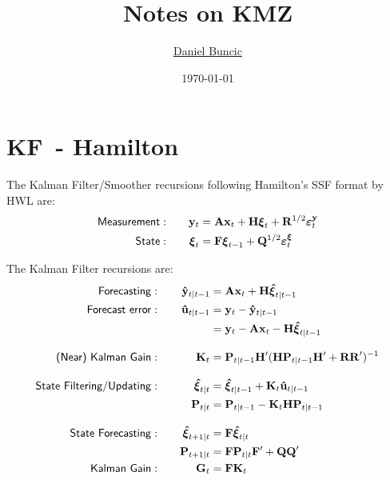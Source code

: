 \documentclass[a4paper,12pt]{article}
\begin{document}
\title{\vspace*{-20mm}Notes on KMZ}
\author{\href{http://www.danielbuncic.com}{Daniel Buncic}}
\date{\vspace*{-4mm}\textsf{\small \today}}
\maketitle

\section{KF\ - Hamilton}

The Kalman Filter/Smoother recursions following Hamilton's SSF format by HWL
are: 
\begin{alignat}{2}
\text{\textsf{Measurement}}& :\quad & \mathbf{y}_{t}& =\mathbf{Ax}_{t}+%
\mathbf{H}\boldsymbol{\xi }_{t}+\mathbf{R}^{1/2}\boldsymbol{\varepsilon }%
_{t}^{\mathbf{y}} \\
\text{\textsf{State}}& :\quad & \boldsymbol{\xi }_{t}& =\mathbf{F}%
\boldsymbol{\xi }_{t-1}+\mathbf{Q}^{1/2}\boldsymbol{\varepsilon }_{t}^{%
\boldsymbol{\xi }}
\end{alignat}

The Kalman Filter recursions are:%
\begin{alignat}{2}
\text{\textsf{Forecasting}}& :\quad  & \mathbf{\hat{y}}_{t|t-1}& =\mathbf{Ax}%
_{t}+\mathbf{H}\boldsymbol{\hat{\xi}}_{t|t-1} \\
\text{\textsf{Forecast error}}& : & \mathbf{\hat{u}}_{t|t-1}& =\mathbf{y}%
_{t}-\mathbf{\hat{y}}_{t|t-1} \\
& & & =\mathbf{y}_{t}-\mathbf{Ax}_{t}-\mathbf{H}\boldsymbol{\hat{\xi}}%
_{t|t-1} \\[3mm]
\text{\textsf{(Near) Kalman Gain}}& :\quad  & \mathbf{K}_{t}& =\mathbf{P}%
_{t|t-1}\mathbf{H}^{\prime }(\mathbf{HP}_{t|t-1}\mathbf{H}^{\prime }+\mathbf{%
RR}^{\prime })^{-1} \\[3mm]
\text{\textsf{State\ Filtering/Updating}}& :\quad  & \boldsymbol{\hat{\xi}}%
_{t|t}& =\boldsymbol{\hat{\xi}}_{t|t-1}+\mathbf{K}_{t}\mathbf{\hat{u}}%
_{t|t-1} \\
& & \mathbf{P}_{t|t}& =\mathbf{P}_{t|t-1}-\mathbf{K}_{t}\mathbf{HP}_{t|t-1}
\\[3mm]
\text{\textsf{State Forecasting}}& :\quad  & \boldsymbol{\hat{\xi}}_{t+1|t}&
=\mathbf{F}\boldsymbol{\hat{\xi}}_{t|t} \\
& & \mathbf{P}_{t+1|t}& =\mathbf{FP}_{t|t}\mathbf{F}^{\prime }+\mathbf{QQ}%
^{\prime } \\
\text{\textsf{Kalman Gain}}& :\quad  & \mathbf{G}_{t}& =\mathbf{FK}_{t}
\end{alignat}
\end{document}
